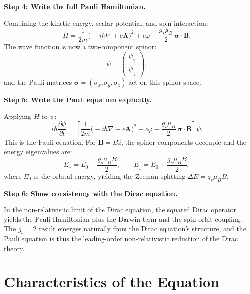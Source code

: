 \textbf{Step 4: Write the full Pauli Hamiltonian.}

Combining the kinetic energy, scalar potential, and spin interaction:
\begin{equation}
H = \frac{1}{2m}\bigl(-i\hbar\nabla + e\mathbf{A}\bigr)^{2} + e\varphi - \frac{g_s\mu_B}{2}\,\boldsymbol{\sigma}\cdot\mathbf{B}.
\end{equation}
The wave function is now a two-component spinor:
\begin{equation}
\psi = \begin{pmatrix}\psi_{\uparrow}\\\psi_{\downarrow}\end{pmatrix},
\end{equation}
and the Pauli matrices $\boldsymbol{\sigma} = (\sigma_x, \sigma_y, \sigma_z)$ act on this spinor space.

\textbf{Step 5: Write the Pauli equation explicitly.}

Applying $H$ to $\psi$:
\begin{equation}
\boxed{\;i\hbar\frac{\partial\psi}{\partial t} = \left[\frac{1}{2m}\bigl(-i\hbar\nabla - e\mathbf{A}\bigr)^{2} + e\varphi - \frac{g_s\mu_B}{2}\,\boldsymbol{\sigma}\cdot\mathbf{B}\right]\psi.\;}
\end{equation}
This is the Pauli equation. For $\mathbf{B} = B\hat{z}$, the spinor components decouple and the energy eigenvalues are:
\begin{equation}
E_{\uparrow} = E_0 - \frac{g_s\mu_B B}{2}, \qquad E_{\downarrow} = E_0 + \frac{g_s\mu_B B}{2},
\end{equation}
where $E_0$ is the orbital energy, yielding the Zeeman splitting $\Delta E = g_s\mu_B B$.

\textbf{Step 6: Show consistency with the Dirac equation.}

In the non-relativistic limit of the Dirac equation, the squared Dirac operator yields the Pauli Hamiltonian plus the Darwin term and the spin-orbit coupling. The $g_s = 2$ result emerges naturally from the Dirac equation's structure, and the Pauli equation is thus the leading-order non-relativistic reduction of the Dirac theory.

\section*{Characteristics of the Equation}

